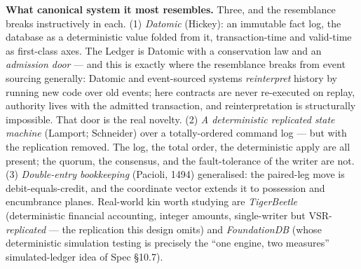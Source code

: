 \documentclass[11pt,a4paper]{article}
\begin{document}
\textbf{What canonical system it most resembles.} Three, and the resemblance breaks
instructively in each. (1) \emph{Datomic} (Hickey): an immutable fact log, the database as a
deterministic value folded from it, transaction-time and valid-time as first-class axes. The
Ledger is Datomic with a conservation law and an \emph{admission door} --- and this is exactly
where the resemblance breaks from event sourcing generally: Datomic and event-sourced systems
\emph{reinterpret} history by running new code over old events; here contracts are never
re-executed on replay, authority lives with the admitted transaction, and reinterpretation is
structurally impossible. That door is the real novelty. (2) \emph{A deterministic replicated
state machine} (Lamport; Schneider) over a totally-ordered command log --- but with the
replication removed. The log, the total order, the deterministic apply are all present; the
quorum, the consensus, and the fault-tolerance of the writer are not. (3) \emph{Double-entry
bookkeeping} (Pacioli, 1494) generalised: the paired-leg move is debit-equals-credit, and the
coordinate vector extends it to possession and encumbrance planes. Real-world kin worth
studying are \emph{TigerBeetle} (deterministic financial accounting, integer amounts,
single-writer but VSR-\emph{replicated} --- the replication this design omits) and
\emph{FoundationDB} (whose deterministic simulation testing is precisely the ``one engine, two
measures'' simulated-ledger idea of Spec §10.7).
\end{document}
